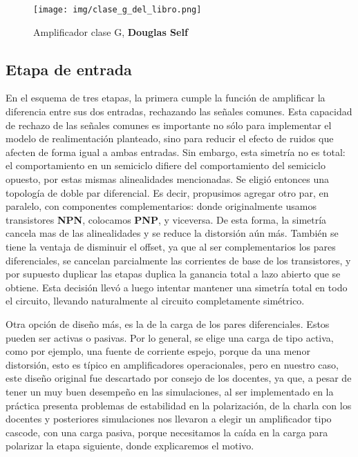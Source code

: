 \clearpage

\begin{figure}[H]
	\centering
	\texttt{[image: img/clase\_g\_del\_libro.png]}
	\caption{Amplificador clase G, \textbf{Douglas Self}~}
	\label{fig:ampli_DS}
\end{figure}


\clearpage

\subsection{Etapa de entrada}

En el esquema de tres etapas, la primera cumple la función de amplificar la diferencia entre sus dos entradas, rechazando las señales comunes. Esta capacidad de rechazo de las señales comunes es importante no sólo para implementar el modelo de realimentación planteado, sino para reducir el efecto de ruidos que afecten de forma igual a ambas entradas.
Sin embargo, esta simetría no es total: el comportamiento en un semiciclo difiere del comportamiento del semiciclo opuesto, por estas mismas alinealidades mencionadas. Se eligió entonces una topología de doble par diferencial. Es decir, propusimos agregar otro par, en paralelo, con componentes complementarios: donde originalmente usamos transistores \textbf{NPN}, colocamos \textbf{PNP}, y viceversa. De esta forma, la simetría cancela mas de las alinealidades y se reduce la distorsión aún más. También se tiene la ventaja de disminuir el offset, ya que al ser complementarios los pares diferenciales, se cancelan parcialmente las corrientes de base de los transistores, y por supuesto duplicar las etapas duplica la ganancia total a lazo abierto que se obtiene. Esta decisión llevó a luego intentar mantener una simetría total en todo el circuito, llevando naturalmente al circuito completamente simétrico. 


Otra opción de diseño más, es la de la carga de los pares diferenciales. Estos pueden ser activas o pasivas. Por lo general, se elige una carga de tipo activa, como por ejemplo, una fuente de corriente espejo, porque da una menor distorsión, esto es típico en amplificadores operacionales, pero en nuestro caso, este diseño original fue descartado por consejo de los docentes, ya que, a pesar de tener un muy buen desempeño en las simulaciones, al ser implementado en la práctica presenta problemas de estabilidad en la polarización, de la charla con los docentes y posteriores simulaciones nos llevaron a elegir un amplificador tipo cascode, con una carga pasiva, porque necesitamos la caída en la carga para polarizar la etapa siguiente, donde explicaremos el motivo. 



